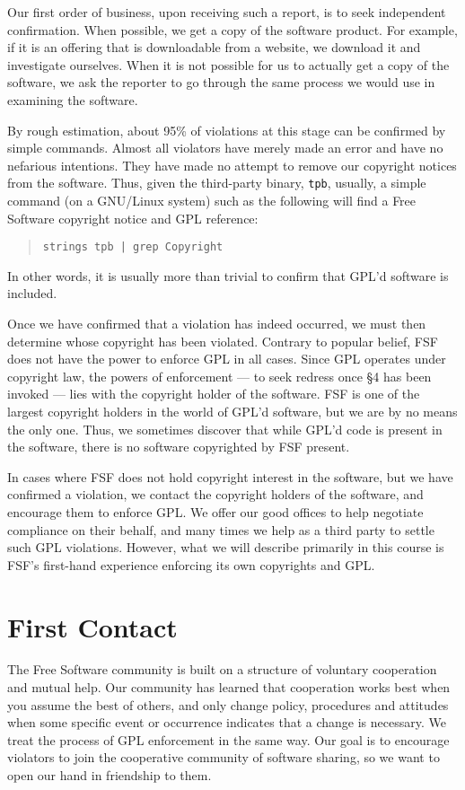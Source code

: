 \documentclass[12pt]{report}
\begin{document}
Our first order of business, upon receiving such a report, is to seek
independent confirmation.  When possible, we get a copy of the software
product.  For example, if it is an offering that is downloadable from a
website, we download it and investigate ourselves.  When it is not
possible for us to actually get a copy of the software, we ask the
reporter to go through the same process we would use in examining the
software.

By rough estimation, about 95\% of violations at this stage can be
confirmed by simple commands.  Almost all violators have merely made an
error and have no nefarious intentions.  They have made no attempt to
remove our copyright notices from the software.  Thus, given the
third-party binary, {\tt tpb}, usually, a simple command (on a GNU/Linux
system) such as the following will find a Free Software copyright notice
and GPL reference:
\begin{quotation}
{\tt strings tpb | grep Copyright}
\end{quotation}
In other words, it is usually more than trivial to confirm that GPL'd
software is included.

Once we have confirmed that a violation has indeed occurred, we must then
determine whose copyright has been violated.  Contrary to popular belief,
FSF does not have the power to enforce GPL in all cases.  Since GPL
operates under copyright law, the powers of enforcement --- to seek
redress once \S 4 has been invoked --- lies with the copyright holder of
the software.  FSF is one of the largest copyright holders in the world of
GPL'd software, but we are by no means the only one.  Thus, we sometimes
discover that while GPL'd code is present in the software, there is no
software copyrighted by FSF present.

In cases where FSF does not hold copyright interest in the software, but
we have confirmed a violation, we contact the copyright holders of the
software, and encourage them to enforce GPL\@.  We offer our good offices
to help negotiate compliance on their behalf, and many times we help as a
third party to settle such GPL violations.  However, what we will describe
primarily in this course is FSF's first-hand experience enforcing its own
copyrights and GPL\@.

\section{First Contact}

The Free Software community is built on a structure of voluntary
cooperation and mutual help.  Our community has learned that cooperation
works best when you assume the best of others, and only change policy,
procedures and attitudes when some specific event or occurrence indicates
that a change is necessary.  We treat the process of GPL enforcement in
the same way.  Our goal is to encourage violators to join the cooperative
community of software sharing, so we want to open our hand in friendship
to them.
\end{document}
